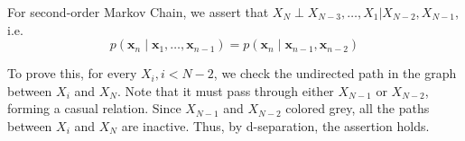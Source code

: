 \begin{exercise}
\begin{solution}
  For second-order Markov Chain, we assert that $X_{N} \perp X_{N-3}, \ldots, X_{1} | X_{N-2}, X_{N-1}$, i.e. 
  $$
    p\left(\boldsymbol{x}_{n} \mid \boldsymbol{x}_{1}, \ldots, \boldsymbol{x}_{n-1}\right)=p\left(\boldsymbol{x}_{n} \mid \boldsymbol{x}_{n-1}, \boldsymbol{x}_{n-2}\right)
    $$
  \end{solution}

  To prove this, for every $X_i, i < N - 2$, we check the undirected path in the graph between $X_i$ and $X_N$. Note that it must pass through either $X_{N-1}$ or $X_{N-2}$, forming a casual relation. Since $X_{N-1}$ and $X_{N-2}$ colored grey, all the paths between $X_i$ and $X_N$ are inactive. Thus, by d-separation, the assertion holds.
  \label{ex2}
\end{exercise}


\newpage

